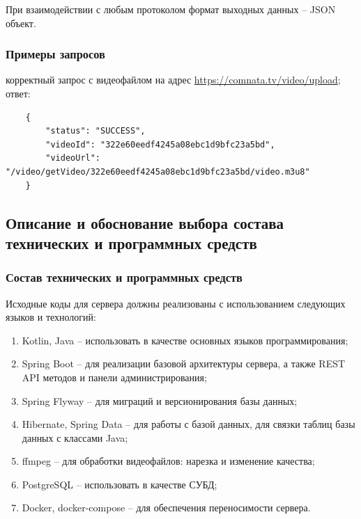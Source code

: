 \documentclass{../includes/TechDoc}
\begin{document}
	При взаимодействии с любым протоколом формат выходных данных -- JSON объект.

    \subsubsection{Примеры запросов}

     корректный запрос с видеофайлом на адрес \url{https://comnata.tv/video/upload};\\

     ответ:
    \begin{lstlisting}
    {
  		"status": "SUCCESS",
  		"videoId": "322e60eedf4245a08ebc1d9bfc23a5bd",
  		"videoUrl": "/video/getVideo/322e60eedf4245a08ebc1d9bfc23a5bd/video.m3u8"
	}
    \end{lstlisting}

    \clearpage

    \subsection{Описание и обоснование выбора состава технических и программных средств}

    \subsubsection{Состав технических и программных средств}

    Исходные коды для сервера должны реализованы с использованием следующих языков и технологий:
	\begin{enumerate}[noitemsep]
	    \item Kotlin, Java -- использовать в качестве основных языков программирования;
	    \item Spring Boot -- для реализации базовой архитектуры сервера, а также REST API методов и панели администрирования;
	    \item Spring Flyway -- для миграций и версионирования базы данных;
	    \item Hibernate, Spring Data -- для работы с базой данных, для связки таблиц базы данных с классами Java;
	    \item ffmpeg -- для обработки видеофайлов: нарезка и изменение качества;
	    \item PostgreSQL -- использовать в качестве СУБД;
	    \item Docker, docker-compose -- для обеспечения переносимости сервера.
	\end{enumerate}
\end{document}
